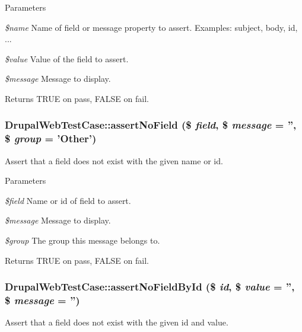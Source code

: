 \begin{DoxyParams}{Parameters}
\item[{\em \$name}]Name of field or message property to assert. Examples: subject, body, id, ... \item[{\em \$value}]Value of the field to assert. \item[{\em \$message}]Message to display. \end{DoxyParams}
\begin{DoxyReturn}{Returns}
TRUE on pass, FALSE on fail. 
\end{DoxyReturn}
\hypertarget{class_drupal_web_test_case_a450b5b0be6615e14e94415e087c31706}{
\subsubsection[{assertNoField}]{\setlength{\rightskip}{0pt plus 5cm}DrupalWebTestCase::assertNoField (\$ {\em field}, \/  \$ {\em message} = {\ttfamily ''}, \/  \$ {\em group} = {\ttfamily 'Other'})}}
\label{class_drupal_web_test_case_a450b5b0be6615e14e94415e087c31706}
Assert that a field does not exist with the given name or id.


\begin{DoxyParams}{Parameters}
\item[{\em \$field}]Name or id of field to assert. \item[{\em \$message}]Message to display. \item[{\em \$group}]The group this message belongs to. \end{DoxyParams}
\begin{DoxyReturn}{Returns}
TRUE on pass, FALSE on fail. 
\end{DoxyReturn}
\hypertarget{class_drupal_web_test_case_adbaec19474181965ddd70c6ee273d113}{
\subsubsection[{assertNoFieldById}]{\setlength{\rightskip}{0pt plus 5cm}DrupalWebTestCase::assertNoFieldById (\$ {\em id}, \/  \$ {\em value} = {\ttfamily ''}, \/  \$ {\em message} = {\ttfamily ''})}}
\label{class_drupal_web_test_case_adbaec19474181965ddd70c6ee273d113}
Assert that a field does not exist with the given id and value.


